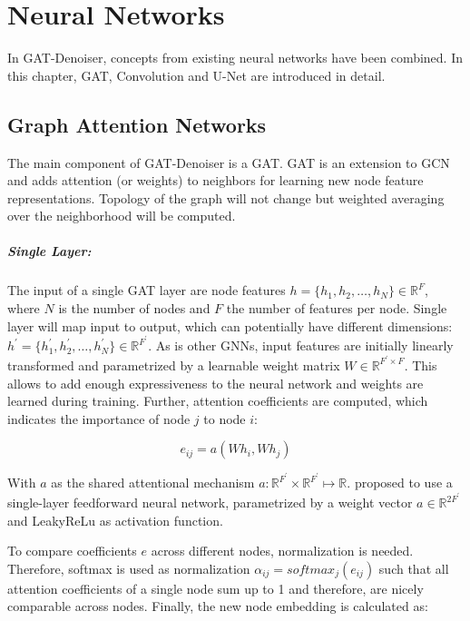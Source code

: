 \chapter{Neural Networks}
\label{sec:neural_networks}
In GAT-Denoiser, concepts from existing neural networks have been combined.
In this chapter, GAT, Convolution and U-Net are introduced in detail.

\section{Graph Attention Networks}
The main component of GAT-Denoiser is a GAT.
GAT is an extension to GCN and adds attention (or weights) to neighbors for learning new node feature representations. 
Topology of the graph will not change but weighted averaging over the neighborhood will be computed.

\paragraph{Single Layer:}
The input of a single GAT layer are node features $h = \{ h_1, h_2, \dots , h_N \} \in \mathbb{R}^F$, 
where $N$ is the number of nodes and $F$ the number of features per node. 
Single layer will map input to output, which can potentially have different dimensions: 
$h^{\prime} = \{ h_1^{\prime}, h_2^{\prime}, \dots, h_N^{\prime} \} \in \mathbb{R}^{F^{\prime}} $.
As is other GNNs, input features are initially linearly transformed and parametrized by a learnable weight matrix 
$W \in \mathbb{R}^{F^{\prime} \times F}$. 
This allows to add enough expressiveness to the neural network and weights are learned during training.
Further, attention coefficients are computed, which indicates the importance of node $j$ to node $i$:

\begin{equation}
  e_{ij} = a(Wh_i, Wh_j)
\end{equation}

With $a$ as the shared attentional mechanism $a : \mathbb{R}^{F^{\prime}} \times \mathbb{R}^{F^{\prime}} \mapsto \mathbb{R}$.
\citet{GAT} proposed to use a single-layer feedforward neural network, parametrized by a weight vector $a \in \mathbb{R}^{2F^{\prime}}$
and LeakyReLu as activation function.

To compare coefficients $e$ across different nodes, normalization is needed.
Therefore, softmax is used as normalization $\alpha_{ij} = softmax_j(e_{ij})$ 
such that all attention coefficients of a single node sum up to 1 and therefore, are nicely comparable across nodes.
Finally, the new node embedding is calculated as:

